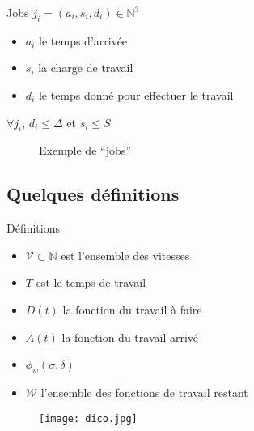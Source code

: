 \documentclass{beamer}
\newcommand{\N}{\mathbb{N}}
\newcommand{\V}{\mathcal{V}}
\newcommand{\W}{\mathcal{W}}
\begin{document}
\begin{frame}{Jobs}
  $j_i=(a_i,s_i,d_i)\in\N^3$
  \begin{itemize}
  \item $a_i$ le temps d'arrivée
  \item $s_i$ la charge de travail
  \item $d_i$ le temps donné pour effectuer le travail
  \end{itemize}

  $\forall j_i$, $d_i\leq\Delta$ et
  $s_i\leq S$
  
  \begin{figure}
  \centering
  \caption{Exemple de ``jobs''}
  \label{fig:jobs}  
\end{figure}
\end{frame}

\subsection{Quelques définitions}

\begin{frame}{Définitions}
  \begin{itemize}
  \item $\V\subset\N$ est l'ensemble des vitesses
  \item $T$ est le temps de travail
  \item $D(t)$ la fonction du travail à faire
  \item $A(t)$ la fonction du travail arrivé
  \item $\phi_w(\sigma,\delta)$
  \item $\W$ l'ensemble des fonctions de travail restant
  \end{itemize}

  \begin{figure}
    \centering
    \texttt{[image: dico.jpg]}
  \end{figure}

\end{frame}
\end{document}

